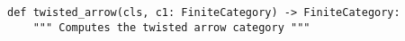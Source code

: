 \begin{verbatim}
def twisted_arrow(cls, c1: FiniteCategory) -> FiniteCategory:
    """ Computes the twisted arrow category """
\end{verbatim}